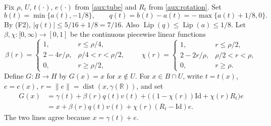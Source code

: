 \documentclass[11pt]{article}
\newcommand{\R}{\mathbb R}
\newcommand{\norm}[1]{\lVert #1\rVert}
\DeclareMathOperator{\Lip}{Lip}
\DeclareMathOperator{\dist}{dist}
\theoremstyle{definition}
\numberwithin{equation}{section}
\begin{document}
Fix \(\rho\), \(U\), \(t(\cdot)\), \(e(\cdot)\) from \cref{aux:tube} and
\(R_t\) from \cref{aux:rotation}. Set
\[
 b(t)=\min\{a(t),-1/8\},\qquad
 q(t)=b(t)-a(t)=-\max\{a(t)+1/8,0\}.
\]
By (F2), \(|q(t)|\le5/16+1/8=7/16\). Also \(\Lip(q)\le\Lip(a)\le1/8\).
Let \(\beta,\chi:[0,\infty)\to[0,1]\) be the continuous piecewise linear
functions
\[
 \beta(r)=
 \begin{cases}
 1,&r\le\rho/4,\\
 2-4r/\rho,&\rho/4<r<\rho/2,\\
 0,&r\ge\rho/2,
 \end{cases}
 \qquad
 \chi(r)=
 \begin{cases}
 1,&r\le\rho/2,\\
 2-2r/\rho,&\rho/2<r<\rho,\\
 0,&r\ge\rho.
 \end{cases}
\]
Define \(G:B\to H\) by \(G(x)=x\) for \(x\notin U\). For \(x\in B\cap U\),
write \(t=t(x)\), \(e=e(x)\), \(r=\norm e=\dist(x,\gamma(\R))\), and set
\begin{equation}\label{aux:G}
 \begin{split}
 G(x)&=\gamma(t)+\beta(r)q(t)v(t)
       +\bigl((1-\chi(r))\mathrm{Id}+\chi(r)R_t\bigr)e\\
 &=x+\beta(r)q(t)v(t)+\chi(r)(R_t-\mathrm{Id})e .
 \end{split}
\end{equation}
The two lines agree because \(x=\gamma(t)+e\).
\end{document}
